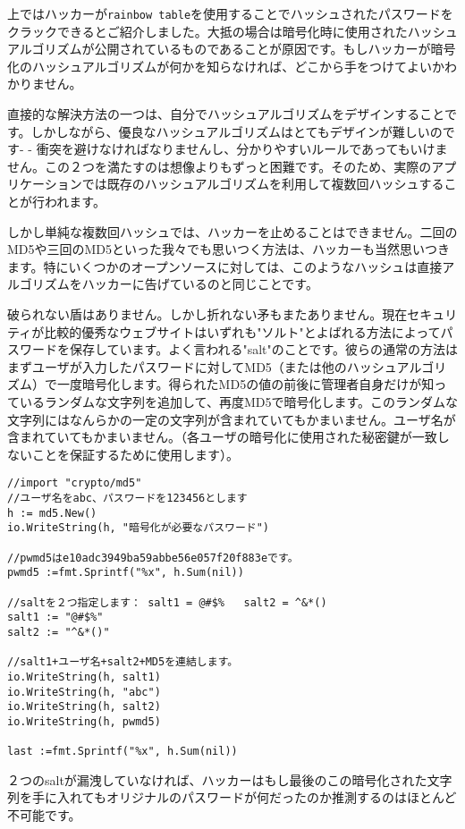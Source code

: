 上ではハッカーが\texttt{rainbow table}を使用することでハッシュされたパスワードをクラックできるとご紹介しました。大抵の場合は暗号化時に使用されたハッシュアルゴリズムが公開されているものであることが原因です。もしハッカーが暗号化のハッシュアルゴリズムが何かを知らなければ、どこから手をつけてよいかわかりません。

直接的な解決方法の一つは、自分でハッシュアルゴリズムをデザインすることです。しかしながら、優良なハッシュアルゴリズムはとてもデザインが難しいのです- - 衝突を避けなければなりませんし、分かりやすいルールであってもいけません。この２つを満たすのは想像よりもずっと困難です。そのため、実際のアプリケーションでは既存のハッシュアルゴリズムを利用して複数回ハッシュすることが行われます。

しかし単純な複数回ハッシュでは、ハッカーを止めることはできません。二回のMD5や三回のMD5といった我々でも思いつく方法は、ハッカーも当然思いつきます。特にいくつかのオープンソースに対しては、このようなハッシュは直接アルゴリズムをハッカーに告げているのと同じことです。

破られない盾はありません。しかし折れない矛もまたありません。現在セキュリティが比較的優秀なウェブサイトはいずれも"ソルト"とよばれる方法によってパスワードを保存しています。よく言われる"salt"のことです。彼らの通常の方法はまずユーザが入力したパスワードに対してMD5（または他のハッシュアルゴリズム）で一度暗号化します。得られたMD5の値の前後に管理者自身だけが知っているランダムな文字列を追加して、再度MD5で暗号化します。このランダムな文字列にはなんらかの一定の文字列が含まれていてもかまいません。ユーザ名が含まれていてもかまいません。（各ユーザの暗号化に使用された秘密鍵が一致しないことを保証するために使用します）。

\begin{lstlisting}[numbers=none]
//import "crypto/md5"
//ユーザ名をabc、パスワードを123456とします
h := md5.New()
io.WriteString(h, "暗号化が必要なパスワード")

//pwmd5はe10adc3949ba59abbe56e057f20f883eです。
pwmd5 :=fmt.Sprintf("%x", h.Sum(nil))

//saltを２つ指定します： salt1 = @#$%   salt2 = ^&*()
salt1 := "@#$%"
salt2 := "^&*()"

//salt1+ユーザ名+salt2+MD5を連結します。
io.WriteString(h, salt1)
io.WriteString(h, "abc")
io.WriteString(h, salt2)
io.WriteString(h, pwmd5)

last :=fmt.Sprintf("%x", h.Sum(nil))
\end{lstlisting}

２つのsaltが漏洩していなければ、ハッカーはもし最後のこの暗号化された文字列を手に入れてもオリジナルのパスワードが何だったのか推測するのはほとんど不可能です。
